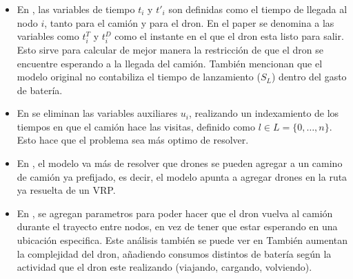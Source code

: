 \begin{itemize}
\item En \cite{ponza2016optimization}, las variables de tiempo $t_i$ y $t'_i$ son definidas como el tiempo de llegada al nodo $i$, tanto para el camión y para el dron. En el paper se denomina a las variables como $t_i^T$ y $t_i^D$ como el instante en el que el dron esta listo para salir. Esto sirve para calcular de mejor manera la restricción de que el dron se encuentre esperando a la llegada del camión. También mencionan que el modelo original no contabiliza el tiempo de lanzamiento ($S_L$) dentro del gasto de batería.
\item En \cite{freitas2021exact} se eliminan las variables auxiliares $u_i$, realizando un indexamiento de los tiempos en que el camión hace las visitas, definido como $l \in L = \{0,\dots,n\}$. Esto hace que el problema sea más optimo de resolver.
\item En \cite{boysen2018drone}, el modelo va más de resolver que drones se pueden agregar a un camino de camión ya prefijado, es decir, el modelo apunta a agregar drones en la ruta ya resuelta de un VRP.
\item En \cite{thomas2024collaborative}, se agregan parametros para poder hacer que el dron vuelva al camión durante el trayecto entre nodos, en vez de tener que estar esperando en una ubicación especifica. Este análisis también se puede ver en También aumentan la complejidad del dron, añadiendo consumos distintos de batería según la actividad que el dron este realizando (viajando, cargando, volviendo). 
\end{itemize}

